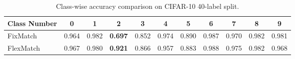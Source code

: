 \begin{table}[h!]
\centering
\caption{Class-wise accuracy comparison on CIFAR-10 40-label split.}
\label{tb-class-wise}
\begin{adjustbox}{width=\columnwidth,center}
\begin{tabular}{lcccccccccc}
\toprule
Class Number &0& 1 & 2 & 3&4&5&6&7&8&9 \\  \midrule
FixMatch&  0.964	&0.982&	\textbf{0.697}&	0.852&	0.974&	0.890&	0.987	&0.970 &	0.982 &	0.981   \\ 

FlexMatch &0.967&	0.980&	\textbf{0.921}&	0.866&	0.957 &	0.883&	0.988&	0.975&	0.982 &	0.968
   \\   \bottomrule
\end{tabular}
\end{adjustbox}
\end{table}


